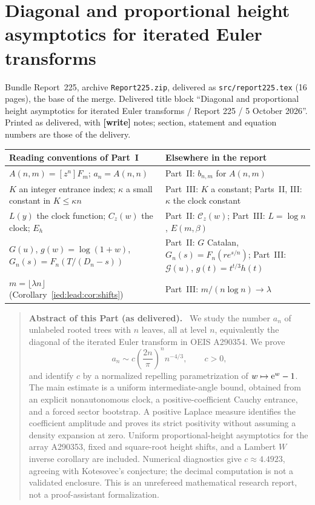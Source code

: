 \documentclass[11pt,letterpaper]{article}
\theoremstyle{remark}\newtheorem{remark}[theorem]{Remark}
\newcommand{\file}[1]{\nolinkurl{#1}}
\newenvironment{partabstract}{\begin{quote}\small\noindent\textbf{Abstract of this Part (as delivered).}\ }{\end{quote}}
\newcommand{\partsource}[1]{\par\noindent\begin{minipage}{\textwidth}\small #1\end{minipage}\par\medskip}
\newcommand{\parteqs}[1]{\setcounter{equation}{0}%
 \renewcommand{\theequation}{#1\arabic{equation}}%
 \renewcommand{\theHequation}{#1\arabic{equation}}}
\begin{document}
\part{Diagonal and proportional height asymptotics for iterated Euler transforms}\label{ied:lead:part}
\parteqs{}
\partsource{Bundle Report~225, archive \file{Report225.zip}, delivered as \file{src/report225.tex} (16 pages), the base of the merge. Delivered title block ``Diagonal and proportional height asymptotics for iterated Euler transforms / Report 225 / 5 October 2026''. Printed as delivered, with \textbf{[write]} notes; section, statement and equation numbers are those of the delivery.}
\begin{center}
\small
\begin{tabular}{@{}>{\raggedright\arraybackslash}p{} >{\raggedright\arraybackslash}p{}@{}}
\toprule
Reading conventions of Part~I & Elsewhere in the report\\
\midrule
$A(n,m)=[z^n]F_m$; $a_n=A(n,n)$ & Part~II: $b_{n,m}$ for $A(n,m)$\\
$K$ an integer entrance index; $\kappa$ a small constant in $K\le\kappa n$ & Part~III: $K$ a constant; Parts~II, III: $\kappa$ the clock constant\\
$L(y)$ the clock function; $C_z(w)$ the clock; $E_h$ & Part~II: $\mathcal C_z(w)$; Part~III: $L=\log n$, $E(m,\beta)$\\
$G(u)$, $g(w)=\log(1+w)$, $G_n(s)=F_n(T/(D_n-s))$ & Part~II: $G$ Catalan, $G_n(s)=F_n(re^{s/n})$; Part~III: $\mathcal G(u)$, $g(t)=t^{t/3}h(t)$\\
$m=\lfloor\lambda n\rfloor$ (Corollary~\ref{ied:lead:cor:shifts}) & Part~III: $m/(n\log n)\to\lambda$\\
\bottomrule
\end{tabular}
\end{center}
\begin{partabstract}
We study the number $a_n$ of unlabeled rooted trees with $n$ leaves, all at level $n$, equivalently the diagonal of the iterated Euler transform in OEIS A290354. We prove
\[
 a_n\sim c\left(\frac{2n}{\pi}\right)^n n^{-4/3},\qquad c>0,
\]
and identify $c$ by a normalized repelling parametrization of $w\mapsto\mathrm e^w-1$. The main estimate is a uniform intermediate-angle bound, obtained from an explicit nonautonomous clock, a positive-coefficient Cauchy entrance, and a forced sector bootstrap. A positive Laplace measure identifies the coefficient amplitude and proves its strict positivity without assuming a density expansion at zero. Uniform proportional-height asymptotics for the array A290353, fixed and square-root height shifts, and a Lambert $W$ inverse corollary are included. Numerical diagnostics give $c\approx4.4923$, agreeing with Kotesovec's conjecture; the decimal computation is not a validated enclosure. This is an unrefereed mathematical research report, not a proof-assistant formalization.
\end{partabstract}
\end{document}
